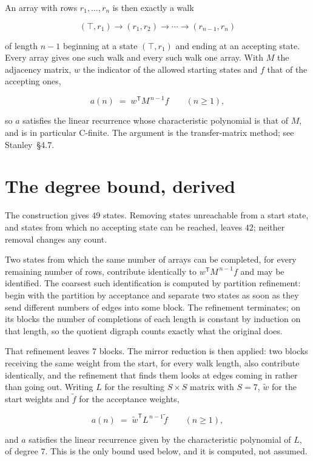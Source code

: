 \documentclass[11pt]{article}
\theoremstyle{definition}
\begin{document}
An array with rows $r_1,\dots,r_n$ is then exactly a walk

\[(\top,r_1) \to (r_1,r_2) \to \cdots \to (r_{n-1},r_n)\]

of length $n-1$ beginning at a state $(\top,r_1)$ and ending at an accepting state. Every array gives one such walk and every such walk one array. With $M$ the adjacency matrix, $w$ the indicator of the allowed starting states and $f$ that of the accepting ones,

\[a(n) \;=\; w^{\mathsf T} M^{\,n-1} f \qquad (n \ge 1),\]

so $a$ satisfies the linear recurrence whose characteristic polynomial is that of $M$, and is in particular C-finite. The argument is the transfer-matrix method; see Stanley~\S4.7.

\section{The degree bound, derived}

The construction gives $49$ states. Removing states unreachable from a start state, and states from which no accepting state can be reached, leaves $42$; neither removal changes any count.

Two states from which the same number of arrays can be completed, for every remaining number of rows, contribute identically to $w^{\mathsf T}M^{\,n-1}f$ and may be identified. The coarsest such identification is computed by partition refinement: begin with the partition by acceptance and separate two states as soon as they send different numbers of edges into some block. The refinement terminates; on its blocks the number of completions of each length is constant by induction on that length, so the quotient digraph counts exactly what the original does.

That refinement leaves $7$ blocks. The mirror reduction is then applied: two blocks receiving the same weight from the start, for every walk length, also contribute identically, and the refinement that finds them looks at edges coming in rather than going out. Writing $L$ for the resulting $S \times S$ matrix with $S = 7$, $\tilde w$ for the start weights and $\tilde f$ for the acceptance weights,

\[a(n) \;=\; \tilde w^{\mathsf T} L^{\,n-1} \tilde f \qquad (n \ge 1),\]

and $a$ satisfies the linear recurrence given by the characteristic polynomial of $L$, of degree $7$. This is the only bound used below, and it is computed, not assumed.
\end{document}
